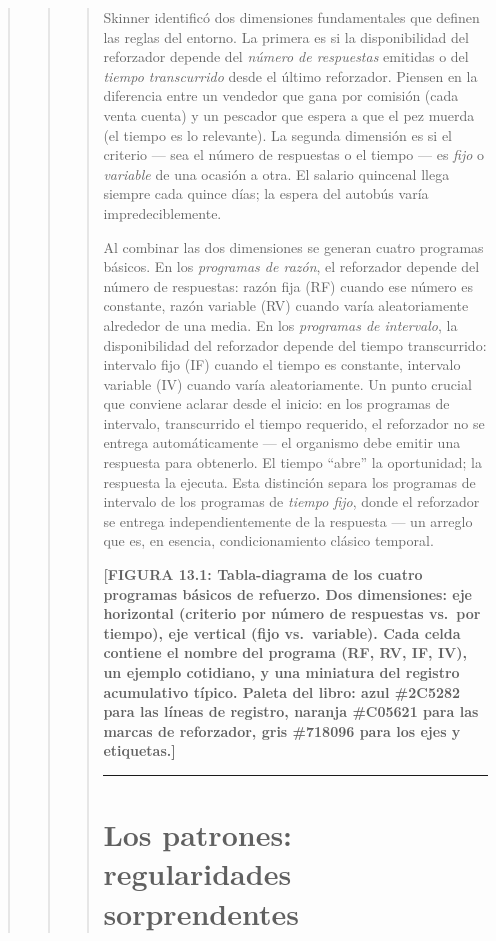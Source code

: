 \documentclass[
  letterpaper,
  DIV=11,
  numbers=noendperiod]{scrreprt}
\begin{document}
\begin{tcolorbox}[enhanced jigsaw, arc=.35mm, bottomrule=.15mm, breakable, colback=white, colframe=quarto-callout-note-color-frame, left=2mm, leftrule=.75mm, opacityback=0, rightrule=.15mm, toprule=.15mm]
\begin{quote}
\begin{quote}
\begin{quote}
Skinner identificó dos dimensiones fundamentales que definen las reglas
del entorno. La primera es si la disponibilidad del reforzador depende
del \emph{número de respuestas} emitidas o del \emph{tiempo
transcurrido} desde el último reforzador. Piensen en la diferencia entre
un vendedor que gana por comisión (cada venta cuenta) y un pescador que
espera a que el pez muerda (el tiempo es lo relevante). La segunda
dimensión es si el criterio --- sea el número de respuestas o el tiempo
--- es \emph{fijo} o \emph{variable} de una ocasión a otra. El salario
quincenal llega siempre cada quince días; la espera del autobús varía
impredeciblemente.

Al combinar las dos dimensiones se generan cuatro programas básicos. En
los \emph{programas de razón}, el reforzador depende del número de
respuestas: razón fija (RF) cuando ese número es constante, razón
variable (RV) cuando varía aleatoriamente alrededor de una media. En los
\emph{programas de intervalo}, la disponibilidad del reforzador depende
del tiempo transcurrido: intervalo fijo (IF) cuando el tiempo es
constante, intervalo variable (IV) cuando varía aleatoriamente. Un punto
crucial que conviene aclarar desde el inicio: en los programas de
intervalo, transcurrido el tiempo requerido, el reforzador no se entrega
automáticamente --- el organismo debe emitir una respuesta para
obtenerlo. El tiempo ``abre'' la oportunidad; la respuesta la ejecuta.
Esta distinción separa los programas de intervalo de los programas de
\emph{tiempo fijo}, donde el reforzador se entrega independientemente de
la respuesta --- un arreglo que es, en esencia, condicionamiento clásico
temporal.

\textbf{{[}FIGURA 13.1: Tabla-diagrama de los cuatro programas básicos
de refuerzo. Dos dimensiones: eje horizontal (criterio por número de
respuestas vs.~por tiempo), eje vertical (fijo vs.~variable). Cada celda
contiene el nombre del programa (RF, RV, IF, IV), un ejemplo cotidiano,
y una miniatura del registro acumulativo típico. Paleta del libro: azul
\#2C5282 para las líneas de registro, naranja \#C05621 para las marcas
de reforzador, gris \#718096 para los ejes y etiquetas.{]}}

\begin{center}\rule{0.5\linewidth}{0.5pt}\end{center}

\mbox{}%
\section{Los patrones: regularidades
sorprendentes}\label{los-patrones-regularidades-sorprendentes}


\end{quote}
\end{quote}
\end{quote}
\end{tcolorbox}
\end{document}

